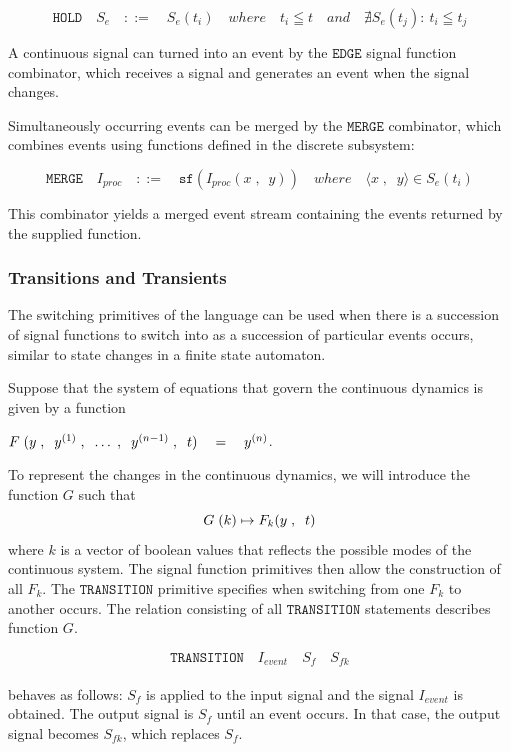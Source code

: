 \documentclass[a4paper]{article}
\begin{document}
\[\texttt{HOLD}\quad{}S_{e}\quad{}::=\quad{}S_{e}(t_{i})\quad{}where \quad{}t_{i}\leqq{}t\quad{} and \quad{}\nexists{S_{e}(t_{j})}:\:t_{i}\leqq{}t_{j}\]

A continuous signal can turned into an event by the $\texttt{EDGE}$
signal function combinator, which receives a signal and generates an
event when the signal changes.

Simultaneously occurring events can be merged by the $\texttt{MERGE}$
combinator, which combines events using functions defined in the
discrete subsystem:

\[\texttt{MERGE}\quad{}I_{proc}\quad{}::=\quad{}\texttt{sf}(I_{proc}(x\;,\:\;y))\quad{}where \quad{}\langle{}x\;,\;\;y\rangle{}\in{}S_{e}(t_{i})\]


This combinator yields a merged event stream containing the events
returned by the supplied function.

\subsubsection{Transitions and Transients}

The switching primitives of the language can be used when there is a
succession of signal functions to switch into as a succession of
particular events occurs, similar to state changes in a finite state
automaton.

Suppose that the system of equations that govern the continuous
dynamics is given by a function

$F\;{\mathrm\mathbf{}(}y\;,\;\;y^{(1)}\;,\;\;\ldots\;,\;\;y^{(n-1)}\;,\;\;t{\mathrm\mathbf{})}\quad{}=\quad{}y^{(n)}$.

To represent the changes in the continuous dynamics, we will introduce
the function $G$ such
that \[G\;{\mathrm\mathbf{}(}k{\mathrm\mathbf{})}\mapsto{}F_{k}{\mathrm\mathbf{}(}y\;,\;\;t{\mathrm\mathbf{})}\]
where $k$ is a vector of boolean values that reflects the possible
modes of the continuous system. The signal function primitives then
allow the construction of all $F_{k}$. The $\texttt{TRANSITION}$ primitive
specifies when switching from one $F_{k}$ to another occurs. The
relation consisting of all $\texttt{TRANSITION}$ statements describes
function $G$.

\[\texttt{TRANSITION}\quad{}I_{event}\quad{}S_{f}\quad{}S_{fk}\]
\\

behaves as follows: $S_{f}$ is applied to the input signal and the
signal $I_{event}$ is obtained. The output signal is $S_{f}$ until an
event occurs. In that case, the output signal becomes $S_{fk}$, which
replaces $S_{f}$.
\end{document}
